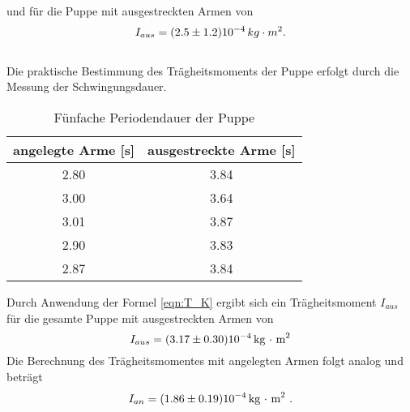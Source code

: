 und für die Puppe mit ausgestreckten Armen von 
\begin{align}
	I_{aus} = (\num{2.5 +- 1.2}) 10^{-4} \, kg \cdot m^2.
\end{align}
\ \\
Die praktische Bestimmung des Trägheitsmoments der Puppe erfolgt durch die Messung der Schwingungsdauer.
\begin{table}
	\centering
	\label{tab:TP}
	\caption{Fünfache Periodendauer der Puppe}
	\begin{tabular}{c c}
		\toprule
		angelegte Arme [s]& ausgestreckte Arme [s] \\
		\midrule
		2.80&3.84\\
		3.00&3.64\\
		3.01&3.87\\
		2.90&3.83\\
		2.87&3.84\\
		\bottomrule
	\end{tabular}
\end{table}
Durch Anwendung der Formel \ref{eqn:T_K} ergibt sich ein Trägheitsmoment $I_{aus}$ für die gesamte Puppe mit ausgestreckten Armen von 
\begin{equation}
	I_{aus} = (\num{3.17 +- 0.30}) 10^{-4} \, \text{kg $\cdot$ m}^2
\end{equation}
Die Berechnung des Trägheitsmomentes mit angelegten Armen folgt analog und beträgt 
\begin{align}
	I_{an} = (\num{1.86 +- 0.19}) 10^{-4} \, \text{kg $\cdot$ m}^2 \ .
\end{align}

